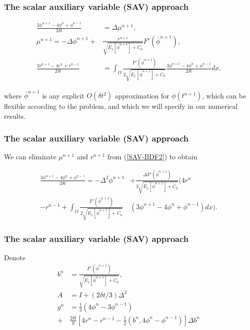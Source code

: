 \documentclass{beamer}
\begin{document}
    \begin{frame}
\frametitle{The scalar auxiliary variable (SAV) approach}

\begin{equation}\label{SAV-BDF2}
  \begin{split}
\frac{3\phi^{n+1}-4\phi^n+\phi^{n-1}}{2\delta t}&=\Delta\mu^{n+1},\\
\mu^{n+1}=-\Delta\phi^{n+1}+&\frac{r^{n+1}}{\sqrt{E_1[\overline{\phi}^{n+1}]+C_0}}F'(\overline{\phi}^{n+1}),\\
\frac{3r^{n+1}-4r^n+r^{n-1}}{2\delta t}&=\int_{\Omega}\frac{F'(\overline{\phi}^{n+1})}{2\sqrt{E_1[\overline{\phi}^{n+1}]+C_0}}\frac{3\phi^{n+1}-4\phi^n+\phi^{n-1}}{2\delta t} dx.
  \end{split}
\end{equation}

where $\overline{\phi}^{n+1}$ is any explicit $O(\delta t^2)$ approximation for $\phi(t^{n+1})$, which can be flexible according to the problem, and which we will specify in our numerical results.

    \end{frame}
    \begin{frame}
\frametitle{The scalar auxiliary variable (SAV) approach}

We can eliminate $\mu^{n+1}$ and $r^{n+1}$ from (\ref{SAV-BDF2}) to obtain

\begin{equation}\label{3.6}
\begin{split}
   \frac{3\phi^{n+1}-4\phi^n+\phi^{n-1}}{2\delta t}=-\Delta^2\phi^{n+1}&+\frac{\Delta F'(\overline{\phi}^{n+1})}{3\sqrt{E_1[\overline{\phi}^{n+1}]+C_0}}(4r^n \\
   -r^{n-1}+\int_{\Omega}\frac{F'(\overline{\phi}^{n+1})}{2\sqrt{E_1[\overline{\phi}^{n+1}]+C_0}}&(3\phi^{n+1}-4\phi^n+\phi^{n-1})dx).
\end{split}
\end{equation}
    \end{frame}
    \begin{frame}
\frametitle{The scalar auxiliary variable (SAV) approach}
Denote
\begin{equation}\label{bn}
  \begin{split}
b^n&=\frac{F'(\overline{\phi}^{n+1})}{\sqrt{E_1[\overline{\phi}^{n+1}]+C_0}}, \\
A&=I+(2\delta t/3)\Delta^2 \\
g^n&=\frac{1}{3}(4\phi^n-3\phi^{n-1})\\
+&\frac{2\delta t}{9}[4r^n-r^{n-1}-\frac{1}{2}(b^n,4\phi^n-\phi^{n-1})]\Delta b^n
  \end{split}
\end{equation}


    \end{frame}
\end{document}
